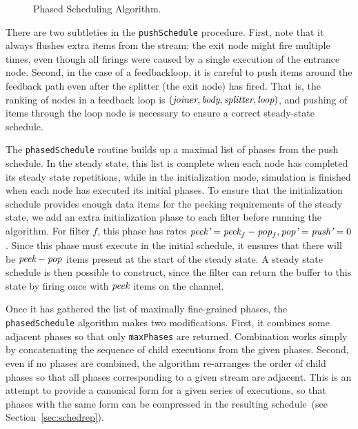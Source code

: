 \documentclass{sig-alt-full}
\begin{document}
\begin{figure}[t]
\vspace{-30pt}
\caption{\small Phased Scheduling Algorithm.\protect\label{fig:phasealg}}
\vspace{-8pt}
\end{figure}

There are two subtleties in the {\tt pushSchedule} procedure.  First,
note that it always flushes extra items from the stream: the exit node
might fire multiple times, even though all firings were caused by a
single execution of the entrance node.  Second, in the case of a
feedbackloop, it is careful to push items around the feedback path
even after the splitter (the exit node) has fired.  That is, the
ranking of nodes in a feedback loop is $(\mbox{\it joiner}, \mbox{\it body},
\mbox{\it splitter}, \mbox{\it loop})$, and pushing of items through the loop node
is necessary to ensure a correct steady-state schedule.

The {\tt phasedSchedule} routine builds up a maximal list of phases
from the push schedule.  In the steady state, this list is complete
when each node has completed its steady state repetitions, while in
the initialization mode, simulation is finished when each node has
executed its initial phases.  To ensure that the initialization
schedule provides enough data items for the peeking requirements of
the steady state, we add an extra initialization phase to each filter
before running the algorithm.  For filter $f$, this phase has rates
$\mbox{\it peek'}=\mbox{\it peek}_f - \mbox{\it pop}_f, \mbox{\it pop'}=\mbox{\it push'}=0$.  Since
this phase must execute in the initial schedule, it ensures that there
will be $\mbox{\it peek}-\mbox{\it pop}$ items present at the start of the steady
state.  A steady state schedule is then possible to construct, since
the filter can return the buffer to this state by firing once with
$\mbox{\it peek}$ items on the channel.

Once it has gathered the list of maximally fine-grained phases, the
{\tt phasedSchedule} algorithm makes two modifications.  First, it
combines some adjacent phases so that only {\tt maxPhases} are
returned.  Combination works simply by concatenating the sequence of
child executions from the given phases.  Second, even if no phases are
combined, the algorithm re-arranges the order of child phases so that
all phases corresponding to a given stream are adjacent.  This is an
attempt to provide a canonical form for a given series of executions,
so that phases with the same form can be compressed in the resulting
schedule~(see Section~\ref{sec:schedrep}).
\end{document}
